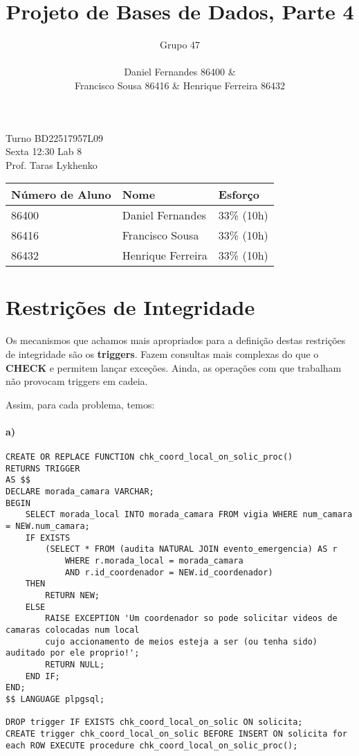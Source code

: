 \documentclass[10pt,a4paper]{article}
\author{Grupo 47 \\\\ Daniel Fernandes 86400 \& \\Francisco Sousa 86416 \& Henrique Ferreira 86432}
\title{Projeto de Bases de Dados, Parte 4}
\begin{document}
\maketitle

\begin{center}
Turno BD22517957L09 \\
Sexta 12:30 Lab 8 \\
Prof. Taras Lykhenko \\
\end{center}

\begin{table}[h]
    \centering
    \begin{tabular}{lll}
    \hline
    \textbf{Número de Aluno} & \textbf{Nome} & \textbf{Esforço} \\ \hline
    86400 & Daniel Fernandes & 33\% (10h) \\ \hline
    86416 & Francisco Sousa & 33\% (10h) \\ \hline
    86432 & Henrique Ferreira & 33\% (10h) \\ \hline
    \end{tabular}
\end{table}
\newpage

\section{Restrições de Integridade}

Os mecanismos que achamos mais apropriados para a definição destas restrições
de integridade são os \textbf{triggers}. Fazem consultas mais complexas do que o
\textbf{CHECK} e permitem lançar exceções.
Ainda, as operações com que trabalham não provocam triggers em cadeia.

Assim, para cada problema, temos:

\paragraph{a)}
\begin{verbatim}
CREATE OR REPLACE FUNCTION chk_coord_local_on_solic_proc() 
RETURNS TRIGGER
AS $$
DECLARE morada_camara VARCHAR;
BEGIN
    SELECT morada_local INTO morada_camara FROM vigia WHERE num_camara = NEW.num_camara;
    IF EXISTS 
        (SELECT * FROM (audita NATURAL JOIN evento_emergencia) AS r
            WHERE r.morada_local = morada_camara
            AND r.id_coordenador = NEW.id_coordenador)
    THEN
        RETURN NEW;
    ELSE
        RAISE EXCEPTION 'Um coordenador so pode solicitar videos de camaras colocadas num local
        cujo accionamento de meios esteja a ser (ou tenha sido) auditado por ele proprio!';
        RETURN NULL;
    END IF;
END;
$$ LANGUAGE plpgsql;

DROP trigger IF EXISTS chk_coord_local_on_solic ON solicita;
CREATE trigger chk_coord_local_on_solic BEFORE INSERT ON solicita for each ROW EXECUTE procedure chk_coord_local_on_solic_proc();
    
\end{verbatim}
\end{document}
